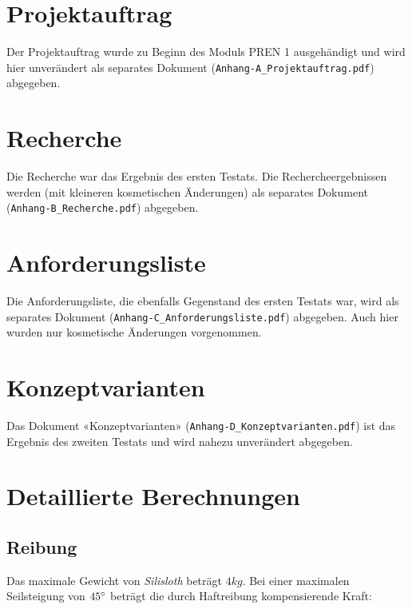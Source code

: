 \pagestyle{plain}
\appendix

\section{Projektauftrag}
\label{app:projektauftrag}

Der Projektauftrag wurde zu Beginn des Moduls PREN 1 ausgehändigt und wird hier unverändert als separates Dokument (\texttt{Anhang-A\_Projektauftrag.pdf}) abgegeben.

\section{Recherche}
\label{app:recherche}

Die Recherche war das Ergebnis des ersten Testats. Die Rechercheergebnissen werden (mit kleineren kosmetischen Änderungen) als separates Dokument (\texttt{Anhang-B\_Recherche.pdf}) abgegeben.

\section{Anforderungsliste}
\label{app:anforderungsliste}

Die Anforderungsliste, die ebenfalls Gegenstand des ersten Testats war, wird als separates Dokument (\texttt{Anhang-C\_Anforderungsliste.pdf}) abgegeben. Auch hier wurden nur kosmetische Änderungen vorgenommen.

\section{Konzeptvarianten}
\label{app:konzeptvarianten}

Das Dokument «Konzeptvarianten» (\texttt{Anhang-D\_Konzeptvarianten.pdf}) ist das Ergebnis des zweiten Testats und wird nahezu unverändert abgegeben.

\section{Detaillierte Berechnungen}

\subsection{Reibung}
\label{app:reibung}

Das maximale Gewicht von \textit{Silisloth} beträgt $4kg$. Bei einer maximalen Seilsteigung von $45\degree$ beträgt die durch Haftreibung kompensierende Kraft:

